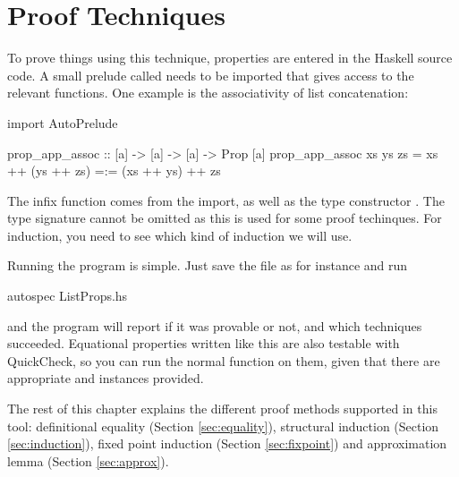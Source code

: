 \chapter{Proof Techniques}

To prove things using this technique, properties are entered in the
Haskell source code. A small prelude called  needs to
be imported that gives access to the relevant functions. One example
is the associativity of list concatenation:

\begin{code}
import AutoPrelude

prop_app_assoc :: [a] -> [a] -> [a] -> Prop [a]
prop_app_assoc xs ys zs = xs ++ (ys ++ zs) =:= (xs ++ ys) ++ zs
\end{code}

The infix function \hs{=:=} comes from the import, as well as the type
constructor . The type signature cannot be omitted as this is
used for some proof techinques. For induction, you need to see which
kind of induction we will use.

Running the program is simple. Just save the file as for instance
 and run

\begin{code}
autospec ListProps.hs
\end{code}

\noindent
and the program will report if it was provable or not, and which
techniques succeeded. Equational properties written like this are also
testable with QuickCheck, so you can run the normal 
function on them, given that there are appropriate  and
 instances provided.

The rest of this chapter explains the different proof methods
supported in this tool: definitional equality (Section
\ref{sec:equality}), structural induction (Section
\ref{sec:induction}), fixed point induction (Section
\ref{sec:fixpoint}) and approximation lemma (Section
\ref{sec:approx}).










